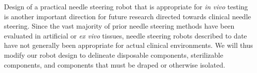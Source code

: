 Design of a practical needle steering robot that is appropriate for \textit{in vivo} testing is another important direction for future research directed towards clinical needle steering. Since the vast majority of prior needle steering methods have been evaluated in artificial or \textit{ex vivo} tissues, needle steering robots described to date have not generally been appropriate for actual clinical environments. We will thus modify our robot design to delineate disposable components, sterilizable components, and components that must be draped or otherwise isolated.